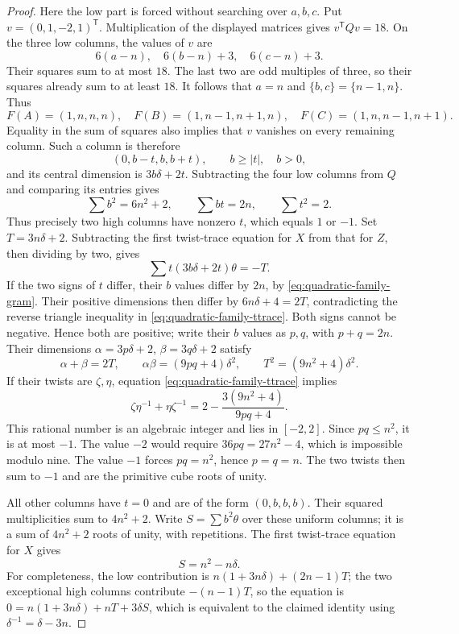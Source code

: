 \begin{proof}
Here the low part is forced without searching over $a,b,c$. Put
$v=(0,1,-2,1)^{\mathsf T}$. Multiplication of the displayed matrices gives
$v^{\mathsf T}Qv=18$. On the three low columns, the values of $v$ are
\[
 6(a-n),\quad 6(b-n)+3,\quad6(c-n)+3.
\]
Their squares sum to at most $18$. The last two are odd multiples of three,
so their squares already sum to at least $18$. It follows that
$a=n$ and $\{b,c\}=\{n-1,n\}$. Thus
\[
 F(A)=(1,n,n,n),\quad F(B)=(1,n-1,n+1,n),\quad
 F(C)=(1,n,n-1,n+1).
\]
Equality in the sum of squares also implies that $v$ vanishes on every
remaining column. Such a column is therefore
\[
 (0,b-t,b,b+t),\qquad b\geq|t|,\quad b>0,
\]
and its central dimension is $3b\delta+2t$. Subtracting the four low columns
from $Q$ and comparing its entries gives
\begin{equation}\label{eq:quadratic-family-gram}
 \sum b^2=6n^2+2,\qquad \sum bt=2n,\qquad\sum t^2=2.
\end{equation}
Thus precisely two high columns have nonzero $t$, which equals $1$ or $-1$.
Set $T=3n\delta+2$. Subtracting the first twist-trace equation for $X$ from
that for $Z$, then dividing by two, gives
\begin{equation}\label{eq:quadratic-family-ttrace}
 \sum t(3b\delta+2t)\theta=-T.
\end{equation}
If the two signs of $t$ differ, their $b$ values differ by $2n$, by
\eqref{eq:quadratic-family-gram}. Their positive dimensions then differ by
$6n\delta+4=2T$, contradicting the reverse triangle inequality in
\eqref{eq:quadratic-family-ttrace}. Both signs cannot be negative. Hence both
are positive; write their $b$ values as $p,q$, with $p+q=2n$.
Their dimensions $\alpha=3p\delta+2$, $\beta=3q\delta+2$ satisfy
\[
 \alpha+\beta=2T,\qquad
 \alpha\beta=(9pq+4)\delta^2,\qquad T^2=(9n^2+4)\delta^2.
\]
If their twists are $\zeta,\eta$, equation
\eqref{eq:quadratic-family-ttrace} implies
\[
 \zeta\eta^{-1}+\eta\zeta^{-1}
 =2-\frac{3(9n^2+4)}{9pq+4}.
\]
This rational number is an algebraic integer and lies in $[-2,2]$.
Since $pq\leq n^2$, it is at most $-1$. The value $-2$ would require
$36pq=27n^2-4$, which is impossible modulo nine. The value $-1$ forces
$pq=n^2$, hence $p=q=n$. The two twists then sum to $-1$ and are the
primitive cube roots of unity.

All other columns have $t=0$ and are of the form $(0,b,b,b)$. Their squared
multiplicities sum to $4n^2+2$. Write $S=\sum b^2\theta$ over these uniform
columns; it is a sum of $4n^2+2$ roots of unity, with repetitions.
The first twist-trace equation for $X$ gives
\[
 S=n^2-n\delta.
\]
For completeness, the low contribution is
$n(1+3n\delta)+(2n-1)T$; the two exceptional high columns contribute
$-(n-1)T$, so the equation is
$0=n(1+3n\delta)+nT+3\delta S$, which is equivalent to the claimed identity
using $\delta^{-1}=\delta-3n$.


\end{proof}
